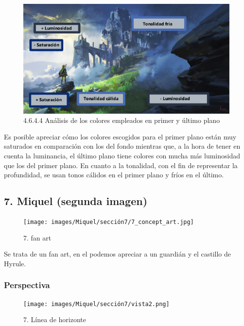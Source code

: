 \documentclass[12pt]{article}
\begin{document}
    \begin{figure}[H]
      \centering
      \includegraphics[width=\textwidth]{images/Nerea/Nerea Zelda concept 644.PNG}
      \caption{\small 4.6.4.4 Análisis de los colores empleados en primer y último plano}
    \end{figure}

    Es posible apreciar cómo los colores escogidos para el primer plano están muy saturados en comparación con los del fondo mientras que, a la hora de tener en cuenta la luminancia, el último plano tiene colores con mucha más luminosidad que los del primer plano. En cuanto a la tonalidad, con el fin de representar la profundidad, se usan tonos cálidos en el primer plano y fríos en el último.
        \newpage


    \subsection{7. Miquel (segunda imagen)}
    \begin{figure}[H]
      \centering
      \texttt{[image: images/Miquel/sección7/7\_concept\_art.jpg]}
      \caption{\small 7. fan art}
    \end{figure}

    Se trata de un fan art, en el podemos apreciar a un guardián y el castillo de Hyrule.

        \subsubsection{Perspectiva}

    \begin{figure}[H]
      \centering
      \texttt{[image: images/Miquel/sección7/vista2.png]}
      \caption{\small 7. Línea de horizonte}
    \end{figure}
\end{document}

